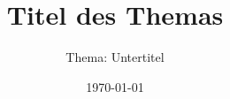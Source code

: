 \subject{Hochschule Kempten\\Fakultät Informatik}
\author{}
\titlehead{\centering\texttt{[image: img/Logo\_HS-Kempten.png]}}
\title{Titel des Themas}
\subtitle{Thema: Untertitel}
\date{\today}
\dedication{Autor: Nachname, Vorname\\Matrikel-Nr.: 111111\\Dozent: Prof. Dr. Nachname, Vorname}